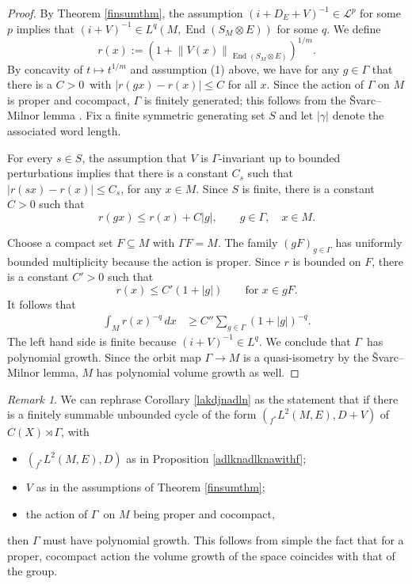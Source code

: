 \documentclass[a4paper,reqno]{amsart}
\numberwithin{equation}{section}
\def\End{\operatorname{End}}
\theoremstyle{definition}
\theoremstyle{remark}
\newtheorem{remark}[thm]{Remark}
\begin{document}
\begin{proof}
By Theorem \ref{finsumthm}, the assumption $(i+D_E+V)^{-1}\in\mathcal{L}^p$ for some $p$ implies that $(i+V)^{-1}\in L^q(M,\End(S_M\otimes E))$ for some $q$. We define
\[r(x):=(1+\left\|V(x)\right\|_{\End(S_M\otimes E)})^{1/m}. \]
By concavity of $t\mapsto t^{1/m}$ and assumption (1) above, we have for any $g\in \Gamma$ that there is a $C>0$ with $|r(g x)- r(x)|\leq C$ for all $x$. Since the action of $\Gamma$ on $M$ is proper and cocompact, $\Gamma$ is finitely generated; this follows from the Švarc--Milnor lemma \cite{BridsonHaefliger1999}. Fix a finite symmetric generating set $S$ and let $|\gamma|$ denote the associated word length.

For every $s\in S$, the assumption that $V$ is $\Gamma$-invariant up to bounded perturbations implies that there is a constant $C_s$ such that $|r(sx)-r(x)|\leq C_s$, for any $x\in M$. Since $S$ is finite, there is a constant $C>0$ such that
\[r(g x)\leq r(x)+C|g|, \qquad g\in\Gamma,\quad x\in M. \]

Choose a compact set $F\subseteq M$ with $\Gamma F=M$. The family $(g F)_{g\in\Gamma}$ has uniformly bounded multiplicity because the action is proper. Since $r$ is bounded on $F$, there is a constant $C'>0$ such that
\[r(x)\leq C'(1+|g|) \qquad\text{for }x\in g F. \]
It follows that
\[
\begin{aligned}
\int_M r(x)^{-q}\,dx
&\geq
C''\sum_{g\in\Gamma}
(1+|g|)^{-q}.
\end{aligned}
\]
The left hand side is finite because $(i+V)^{-1}\in L^q$. We conclude that $\Gamma$ has polynomial growth. Since the orbit map $\Gamma\to M$ is a quasi-isometry by the Švarc--Milnor lemma, $M$ has polynomial volume growth as well.
\end{proof}






\begin{remark}
We can rephrase Corollary \ref{lakdjnadln} as the statement that if there is a finitely summable unbounded cycle of the form $(_{f^*}L^2(M,E),D+V)$ of $C(X)\rtimes \Gamma$, with 
\begin{itemize}
\item $(_{f^*}L^2(M,E),D)$ as in Proposition \ref{adlknadlknawithf};
\item $V$ as in the assumptions of Theorem \ref{finsumthm};
\item the action of $\Gamma$ on $M$ being proper and cocompact,
\end{itemize}
then $\Gamma$ must have polynomial growth. This follows from simple the fact that for a proper, cocompact action the volume growth of the space coincides with that of the group.
\end{remark}
\end{document}
